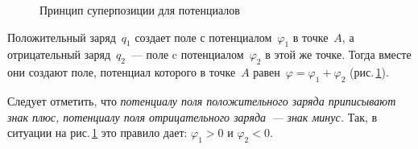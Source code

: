 \documentclass[main.tex]{subfiles}
\begin{document}
\begin{NoHyper}
\begin{figure}[H]
\caption{Принцип суперпозиции для потенциалов}
\label{fig:p106}
\end{figure}

Положительный заряд~$q_1$ создает поле с потенциалом~$\varphi_1$ в точке~$A$, а отрицательный заряд~$q_2$~--- поле c потенциалом~$\varphi_2$ в этой же точке. Тогда вместе они создают поле, потенциал которого в точке~$A$ равен~$\varphi=\varphi_1+\varphi_2$ (рис.\,\ref{fig:p106}). 

Следует отметить, что \emph{потенциалу поля положительного заряда приписывают знак плюс, потенциалу поля отрицательного заряда~--- знак минус.} Так, в ситуации на рис.\,\ref{fig:p106} это правило дает: $\varphi_1>0$ и $\varphi_2<0$. 




\end{NoHyper}
\end{document}
